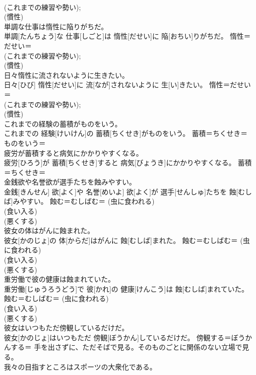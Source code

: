 \documentclass[8pt]{extreport}
\begin{document}
\begin{CJK}{UTF8}{min}
{\\	(これまでの練習や勢い); 
\\	(慣性)
\\	単調な仕事は惰性に陥りがちだ。	
\\	単調[たんちょう]な 仕事[しごと]は 惰性[だせい]に 陥[おちい]りがちだ。	惰性＝だせい＝ 
\\	(これまでの練習や勢い); 
\\	(慣性)
\\	日々惰性に流されないように生きたい。	
\\	日々[ひび] 惰性[だせい]に 流[なが]されないように 生[い]きたい。	惰性＝だせい＝ 
\\	(これまでの練習や勢い); 
\\	(慣性)
\\	これまでの経験の蓄積がものをいう。	
\\	これまでの 経験[けいけん]の 蓄積[ちくせき]がものをいう。	蓄積＝ちくせき＝　
\\	ものをいう＝ 
\\	疲労が蓄積すると病気にかかりやすくなる。	
\\	疲労[ひろう]が 蓄積[ちくせき]すると 病気[びょうき]にかかりやすくなる。	蓄積＝ちくせき＝　
\\	金銭欲や名誉欲が選手たちを蝕みやすい。	
\\	金銭[きんせん] 欲[よく]や 名誉[めいよ] 欲[よく]が 選手[せんしゅ]たちを 蝕[むしば]みやすい。	蝕む＝むしばむ＝ (虫に食われる) 
\\	(食い入る) 
\\	(悪くする) 
\\	彼女の体はがんに蝕まれた。	
\\	彼女[かのじょ]の 体[からだ]はがんに 蝕[むしば]まれた。	蝕む＝むしばむ＝ (虫に食われる) 
\\	(食い入る) 
\\	(悪くする) 
\\	重労働で彼の健康は蝕まれていた。	
\\	重労働[じゅうろうどう]で 彼[かれ]の 健康[けんこう]は 蝕[むしば]まれていた。	蝕む＝むしばむ＝ (虫に食われる) 
\\	(食い入る) 
\\	(悪くする) 
\\	彼女はいつもただ傍観しているだけだ。	
\\	彼女[かのじょ]はいつもただ 傍観[ぼうかん]しているだけだ。	傍観する＝ぼうかんする＝ 手を出さずに、ただそばで見る。そのものごとに関係のない立場で見る。
\\	我々の目指すところはスポーツの大衆化である。	
}
\end{CJK}
\end{document}
